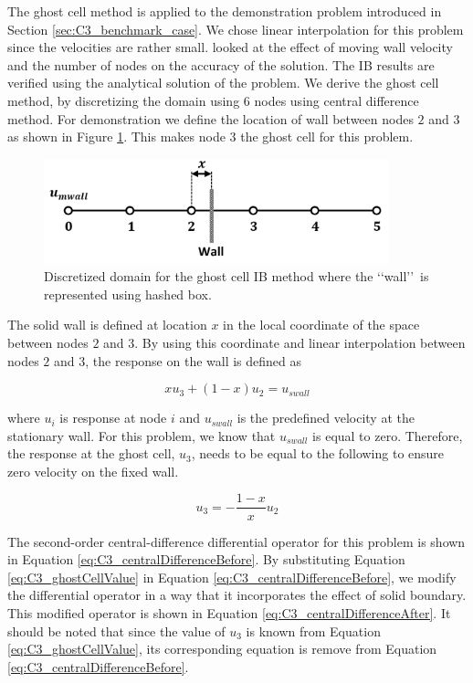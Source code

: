The ghost cell method is applied to the demonstration problem introduced in Section \ref{sec:C3_benchmark_case}. We chose linear interpolation for this problem since the velocities are rather small. looked at the effect of moving wall velocity and the number of nodes on the accuracy of the solution. The IB results are verified using the analytical solution of the problem. We derive the ghost cell method, by discretizing the domain using 6 nodes using central difference method. For demonstration we define the location of wall between nodes $2$ and $3$ as shown in Figure \ref{fig:C3_discretizedGhostCell}. This makes node $3$ the ghost cell for this problem.

\begin{figure}[H]
	\centering
	\includegraphics[width=10.00cm]{Chapter_3/figure/ghost_cell_discretization.png}
	\caption{Discretized domain for the ghost cell IB method where the \lq\lq wall\rq\rq\ is represented using hashed box.}
	\label{fig:C3_discretizedGhostCell}
\end{figure}

The solid wall is defined at location $x$ in the local coordinate of the space between nodes $2$ and $3$. By using this coordinate and linear interpolation between nodes $2$ and $3$, the response on the wall is defined as

\begin{equation}
	x u_3 + (1 - x) u_2 = u_{swall}
\end{equation}

where $u_i$ is response at node $i$ and $u_{swall}$ is the predefined velocity at the stationary wall. For this problem, we know that $u_{swall}$ is equal to zero. Therefore, the response at the ghost cell, $u_3$, needs to be equal to the following to ensure zero velocity on the fixed wall.

\begin{equation}\label{eq:C3_ghostCellValue}
	u_3 = -\frac{1 - x}{x} u_2
\end{equation}

The second-order central-difference differential operator for this problem is shown in Equation \eqref{eq:C3_centralDifferenceBefore}. By substituting Equation \eqref{eq:C3_ghostCellValue} in Equation \eqref{eq:C3_centralDifferenceBefore}, we modify the differential operator in a way that it incorporates the effect of solid boundary. This modified operator is shown in Equation \eqref{eq:C3_centralDifferenceAfter}. It should be noted that since the value of $u_3$ is known from Equation \eqref{eq:C3_ghostCellValue}, its corresponding equation is remove from Equation \eqref{eq:C3_centralDifferenceBefore}.


